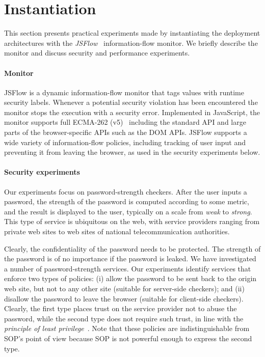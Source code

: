 \documentclass{llncs}
\begin{document}

\section{Instantiation}
\label{sec:case}

This section presents practical experiments made by instantiating the deployment
architectures with the \emph{JSFlow}~\cite{Hedin:Sabelfeld:CSF12,JSFlow} information-flow monitor. 
We briefly describe the monitor and discuss security and performance experiments.

\paragraph{Monitor}

JSFlow is a dynamic information-flow monitor that tags values with runtime
security labels. Whenever a potential security
violation has been encountered the monitor stops the execution with a security
error. Implemented in JavaScript, the monitor supports
full 
ECMA-262 (v5)~\cite{ecma:262:5} including the standard API and large parts of the
browser-specific APIs such as the DOM APIs. 
JSFlow supports a wide variety of information-flow policies,
including tracking of user input and preventing it from leaving the
browser, as used in
the security experiments below.

\paragraph{Security experiments}
Our experiments focus on password-strength checkers. 
After the user inputs a password, the strength of the password is computed according
to some metric, and the result is displayed to the user, typically on a scale
from \emph{weak} to \emph{strong}. This type of service is ubiquitous
on the web, with service providers ranging from private web sites to web sites
of national telecommunication authorities.

Clearly, the confidentiality of the password needs to be protected.  The
strength of the password is of no importance if the password is leaked.  We
have investigated a number of password-strength services. 
Our experiments identify services that enforce two types of policies: (i)
allow the password to be sent back to the origin web site, but not to
any other site (suitable for server-side checkers); and (ii) disallow the password
to leave the browser (suitable for client-side checkers). 
Clearly, the first type places trust on the service provider not to
abuse the password, while the second type does not require such trust,
in line with the \emph{principle of least
privilege}~\cite{Saltzer:Schroeder:TCB}.
Note that these policies are indistinguishable from SOP's point of
view because SOP is not powerful enough to express the second type.
\end{document}
